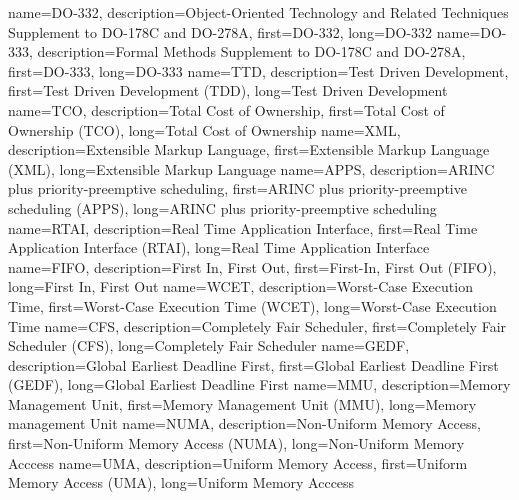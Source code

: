 {%
    name={DO-332},
    description={Object-Oriented Technology and Related Techniques Supplement to DO-178C and DO-278A},
    first={DO-332},
    long={DO-332}
}
{%
    name={DO-333},
    description={Formal Methods Supplement to DO-178C and DO-278A},
    first={DO-333},
    long={DO-333}
}
{%
    name={TTD},
    description={Test Driven Development},
    first={Test Driven Development (TDD)},
    long={Test Driven Development}
}
{%
    name={TCO},
    description={Total Cost of Ownership},
    first={Total Cost of Ownership (TCO)},
    long={Total Cost of Ownership}
}
{%
    name={XML},
    description={Extensible Markup Language},
    first={Extensible Markup Language (XML)},
    long={Extensible Markup Language}
}
{%
    name={APPS},
    description={ARINC plus priority-preemptive scheduling},
    first={ARINC plus priority-preemptive scheduling (APPS)},
    long={ARINC plus priority-preemptive scheduling}
}
{%
    name={RTAI},
    description={Real Time Application Interface},
    first={Real Time Application Interface (RTAI)},
    long={Real Time Application Interface}
}
{%
    name={FIFO},
    description={First In, First Out},
    first={First-In, First Out (FIFO)},
    long={First In, First Out}
}
{%
    name={WCET},
    description={Worst-Case Execution Time},
    first={Worst-Case Execution Time (WCET)},
    long={Worst-Case Execution Time}
}
{%
    name={CFS},
    description={Completely Fair Scheduler},
    first={Completely Fair Scheduler (CFS)},
    long={Completely Fair Scheduler}
}
{%
    name={GEDF},
    description={Global Earliest Deadline First},
    first={Global Earliest Deadline First (GEDF)},
    long={Global Earliest Deadline First}
}
{%
    name={MMU},
    description={Memory Management Unit},
    first={Memory Management Unit (MMU)},
    long={Memory management Unit}
}
{%
    name={NUMA},
    description={Non-Uniform Memory Access},
    first={Non-Uniform Memory Access (NUMA)},
    long={Non-Uniform Memory Acccess}
}
{%
    name={UMA},
    description={Uniform Memory Access},
    first={Uniform Memory Access (UMA)},
    long={Uniform Memory Acccess}
}